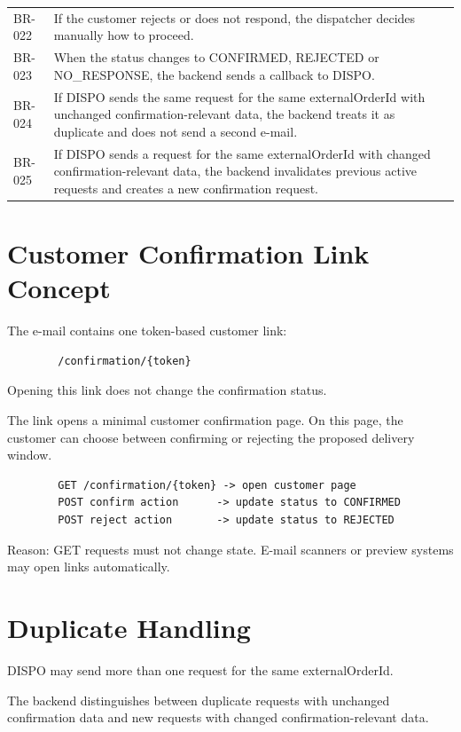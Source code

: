 \documentclass[a4paper,11pt]{article}
\begin{document}
\begin{longtable}{p{2cm}p{11cm}}
	BR-022 & If the customer rejects or does not respond, the dispatcher decides manually how to proceed. \\
	BR-023 & When the status changes to CONFIRMED, REJECTED or NO\_RESPONSE, the backend sends a callback to DISPO. \\
	BR-024 & If DISPO sends the same request for the same externalOrderId with unchanged confirmation-relevant data, the backend treats it as duplicate and does not send a second e-mail. \\
	BR-025 & If DISPO sends a request for the same externalOrderId with changed confirmation-relevant data, the backend invalidates previous active requests and creates a new confirmation request. \\
	\bottomrule
\end{longtable}
	
	\section{Customer Confirmation Link Concept}
	
	The e-mail contains one token-based customer link:
	
	\begin{lstlisting}
		/confirmation/{token}
	\end{lstlisting}
	
	Opening this link does not change the confirmation status.
	
	The link opens a minimal customer confirmation page. On this page, the customer can choose between confirming or rejecting the proposed delivery window.
	
	\begin{lstlisting}
		GET /confirmation/{token} -> open customer page
		POST confirm action      -> update status to CONFIRMED
		POST reject action       -> update status to REJECTED
	\end{lstlisting}
	
	Reason: GET requests must not change state. E-mail scanners or preview systems may open links automatically.
	
	
	\section{Duplicate Handling}
	
	DISPO may send more than one request for the same externalOrderId.
	
	The backend distinguishes between duplicate requests with unchanged confirmation data and new requests with changed confirmation-relevant data.
	
\end{document}
